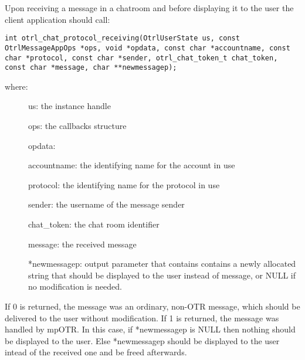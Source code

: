 Upon receiving a message in a chatroom and before displaying it to the user the client application should call:
\begin{lstlisting}
int otrl_chat_protocol_receiving(OtrlUserState us, const OtrlMessageAppOps *ops, void *opdata, const char *accountname, const char *protocol, const char *sender, otrl_chat_token_t chat_token, const char *message, char **newmessagep);
\end{lstlisting}
where:
\begin{description}
  \item[] us: the instance handle
  \item[] ops: the callbacks structure
  \item[] opdata: 
  \item[] accountname: the identifying name for the account in use
  \item[] protocol: the identifying name for the protocol in use
  \item[] sender: the username of the message sender
  \item[] chat\_token: the chat room identifier
  \item[] message: the received message
  \item[] *newmessagep: output parameter that contains contains a newly allocated string that should be displayed to the user instead of message, or NULL if no modification is needed.
\end{description}
If 0 is returned, the message was an ordinary, non-OTR message, which should be delivered to the user without modification.
If 1 is returned, the message was handled by mpOTR. In this case, if *newmessagep is NULL then nothing should be displayed to the user. Else *newmessagep should be displayed to the user intead of the received one and be freed afterwards.

